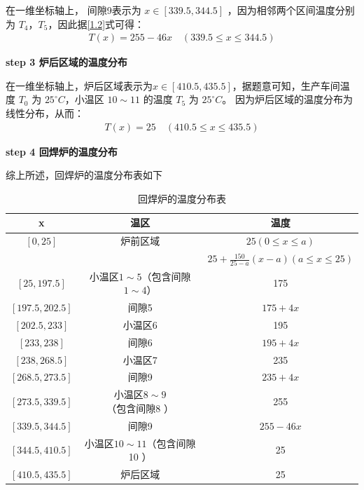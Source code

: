 \documentclass[../main.tex]{subfiles}
\begin{document}
            \par 在一维坐标轴上， 间隙9表示为 \(x\in[339.5,344.5]\) ，因为相邻两个区间温度分别为 \(T_4\)，\(T_5\)，因此据\eqref{1.2}式可得：
            \begin{align}\label{1.14}
               T(x)=255 - 46x\quad(339.5\leq x\leq344.5)
                \end{align}   
\par \textbf{step 3 炉后区域的温度分布}  
\par 在一维坐标轴上，炉后区域表示为$x\in \left[ 410.5,435.5 \right] $，据题意可知，生产车间温度 \(T_0\) 为 \(25^{\circ}C\)，小温区 \(10\sim11\) 的温度 \(T_5\) 为 \(25^{\circ}C\)。
因为炉后区域的温度分布为线性分布，从而：
\begin{align}\label{1.15}
    T(x)=25\quad(410.5\leq x\leq435.5)
    \end{align}
    \par \textbf{step 4 回焊炉的温度分布} 
\par 综上所述，回焊炉的温度分布表如下
\begin{table}[H]\label{1.16}
    \centering
    \caption{回焊炉的温度分布表}
    \renewcommand{\arrayrulewidth}{2.0pt}
    \begin{tabular}{c|c|c} 
    \hline
    x & 温区 & 温度  \\ 
    \hline
   $ \left[ 0,25 \right]$& 炉前区域 & $25(0\leq x\leq a) $  \\ 
    \cline{3-3}
      &      & $25+\frac{150}{25 - a}(x - a)(a \leq x \leq 25)$   \\ 
    \hline
    $\left[ 25,197.5 \right]$& 小温区$1\sim5$（包含间隙$1\sim4 $）  & 175 \\ 
    \hline
    $\left[ 197.5,202.5 \right]   $& 间隙5     & $175 + 4x$     \\ 
    \hline
   $ \left[ 202.5,233\right] $ & 小温区6   &  195    \\ 
    \hline
   $ \left[ 233,238 \right] $  &    间隙6   &   $195 + 4x$     \\ 
    \hline
    $ \left[ 238,268.5\right] $& 小温区7     &  235    \\ 
    \hline
 $ \left[ 268.5,273.5 \right] $    &   间隙9   &   $235 + 4x$     \\ 
    \hline
$ \left[ 273.5,339.5 \right] $ & 小温区$8\sim 9$（包含间隙8 ）     &   255   \\ 
    \hline
$ \left[ 339.5,344.5 \right] $&  间隙9    &  $255 - 46x$      \\ 
    \hline
$     \left[ 344.5,410.5 \right]$  & 小温区$10 \sim 11$（包含间隙10 ）          & 25     \\ 
    \hline
    $\left[ 410.5,435.5 \right]$        & 炉后区域     &   25   \\
    \hline
    \end{tabular}
    \end{table} 
\end{document}
